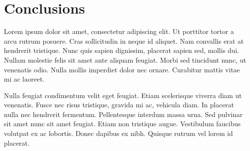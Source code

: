 
\section{Conclusions} %
\label{sec:conclusions}

Lorem ipsum dolor sit amet, consectetur adipiscing elit. Ut porttitor tortor a arcu rutrum posuere. Cras sollicitudin in neque id aliquet. Nam convallis erat at hendrerit tristique. Nunc quis sapien dignissim, placerat sapien sed, mollis dui. Nullam molestie felis sit amet ante aliquam feugiat. Morbi sed tincidunt nunc, ut venenatis odio. Nulla mollis imperdiet dolor nec ornare. Curabitur mattis vitae mi ac laoreet.

Nulla feugiat condimentum velit eget feugiat. Etiam scelerisque viverra diam ut venenatis. Fusce nec risus tristique, gravida mi ac, vehicula diam. In placerat nulla nec hendrerit fermentum. Pellentesque interdum massa urna. Sed pulvinar sit amet nunc sit amet feugiat. Etiam non tristique augue. Vestibulum faucibus volutpat ex ac lobortis. Donec dapibus ex nibh. Quisque rutrum vel lorem id placerat.

